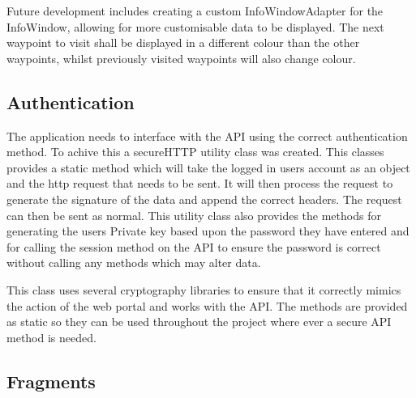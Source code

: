 \documentclass[11pt,a4paper]{article}
\begin{document}
Future development includes creating a custom InfoWindowAdapter for the InfoWindow, allowing for more customisable data to be displayed. The next waypoint to visit shall be displayed in a different colour than the other waypoints, whilst previously visited waypoints will also change colour. 


\subsection{Authentication}
\label{sec:authorisation}
The application needs to interface with the API using the correct authentication method. To achive this a secureHTTP utility class was created. This classes provides a static method which will take the logged in users account as an object and the http request that needs to be sent. It will then process the request to generate the signature of the data and append the correct headers. The request can then be sent as normal. This utility class also provides the methods for generating the users Private key based upon the password they have entered and for calling the session method on the API to ensure the password is correct without calling any methods which may alter data. 

This class uses several cryptography libraries to ensure that it correctly mimics the action of the web portal and works with the API. The methods are provided as static so they can be used throughout the project where ever a secure API method is needed. 

\subsection{Fragments}
\label{sec:fragments}
\end{document}
